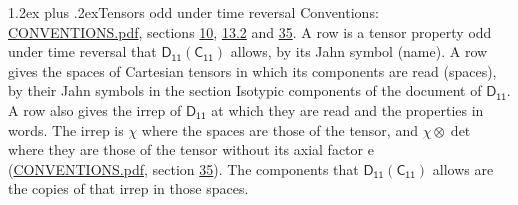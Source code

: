 \documentclass[10pt,a4paper]{article}
\makeatletter
\renewcommand\section{\@startsection{section}{1}{\z@}{-3ex plus -1ex minus -.2ex}%
  {1.2ex plus .2ex}{\normalfont\large\sffamily\bfseries\color{parttitle}}}
\numberwithin{equation}{section}
\newcommand{\grp}[1]{\mathsf{#1}}
\newcommand{\irrprod}{\otimes}
\makeatother
\begin{document}
\section{Tensors odd under time reversal}\label{s:time_odd}
Conventions: \href{../../CONVENTIONS.pdf}{CONVENTIONS.pdf}, sections \href{../../../rotation/CONVENTIONS.pdf\#conv.10}{10}, \href{../../../rotation/CONVENTIONS.pdf\#conv.13.2}{13.2} and \href{../../CONVENTIONS.pdf\#conv.35}{35}.
\leavevmode\label{n:head.name.property}A row is a tensor property odd under time reversal that $\grp{D_{11}}(\grp{C_{11}})$ allows, by its Jahn symbol (name). \label{n:head.spaces}A row gives the spaces of Cartesian tensors in which its components are read (spaces), by their Jahn symbols in the section Isotypic components of the document of \href{../../../rotation/data/pdf/D11.pdf}{$\grp{D_{11}}$}. \label{n:head.properties}A row also gives the irrep of $\grp{D_{11}}$ at which they are read and the properties in words. The irrep is $\chi$ where the spaces are those of the tensor, and $\chi \irrprod \det$ where they are those of the tensor without its axial factor e (\href{../../CONVENTIONS.pdf}{CONVENTIONS.pdf}, section \href{../../CONVENTIONS.pdf\#conv.35}{35}). The components that $\grp{D_{11}}(\grp{C_{11}})$ allows are the copies of that irrep in those spaces.
\end{document}
